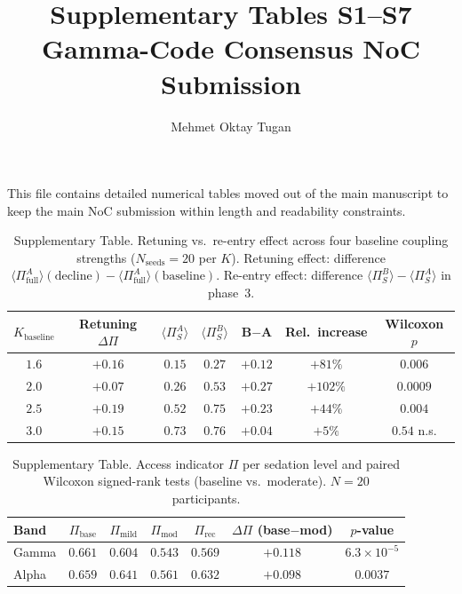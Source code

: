 \documentclass[11pt]{article}
\title{Supplementary Tables S1--S7\\Gamma-Code Consensus NoC Submission}
\author{Mehmet Oktay Tugan}
\date{}
\begin{document}
\maketitle
\noindent This file contains detailed numerical tables moved out of the main manuscript to keep the main NoC submission within length and readability constraints.

\begin{table}[h]
\centering
\caption{Supplementary Table. Retuning vs.\ re-entry effect across four baseline coupling strengths ($N_{\mathrm{seeds}} = 20$ per $K$). Retuning effect: difference $\langle\Pi_{\mathrm{full}}^A\rangle(\mathrm{decline}) - \langle\Pi_{\mathrm{full}}^A\rangle(\mathrm{baseline})$. Re-entry effect: difference $\langle\Pi_S^B\rangle - \langle\Pi_S^A\rangle$ in phase~3.}
\label{tab:retuning}
\begin{tabular}{ccccccc}
\hline
$K_{\mathrm{baseline}}$ & Retuning $\Delta\Pi$ & $\langle\Pi_S^A\rangle$ & $\langle\Pi_S^B\rangle$ & B$-$A & Rel.\ increase & Wilcoxon $p$ \\
\hline
$1.6$ & $+0.16$ & $0.15$ & $0.27$ & $+0.12$ & $+81\%$  & $0.006$ \\
$2.0$ & $+0.07$ & $0.26$ & $0.53$ & $+0.27$ & $+102\%$ & $0.0009$ \\
$2.5$ & $+0.19$ & $0.52$ & $0.75$ & $+0.23$ & $+44\%$  & $0.004$ \\
$3.0$ & $+0.15$ & $0.73$ & $0.76$ & $+0.04$ & $+5\%$   & $0.54$ n.s. \\
\hline
\end{tabular}
\end{table}

\begin{table}[h]
\centering
\caption{Supplementary Table. Access indicator $\Pi$ per sedation level and paired Wilcoxon signed-rank tests (baseline vs.~moderate). $N = 20$ participants.}
\label{tab:pilot-results}
\small
\begin{tabular}{lcccccc}
\toprule
Band & $\Pi_{\mathrm{base}}$ & $\Pi_{\mathrm{mild}}$ & $\Pi_{\mathrm{mod}}$ & $\Pi_{\mathrm{rec}}$ & $\Delta\Pi$ (base$-$mod) & $p$-value \\
\midrule
Gamma & $0.661$ & $0.604$ & $0.543$ & $0.569$ & $+0.118$ & $6.3 \times 10^{-5}$ \\
Alpha & $0.659$ & $0.641$ & $0.561$ & $0.632$ & $+0.098$ & $0.0037$ \\
\bottomrule
\end{tabular}
\end{table}
\end{document}
